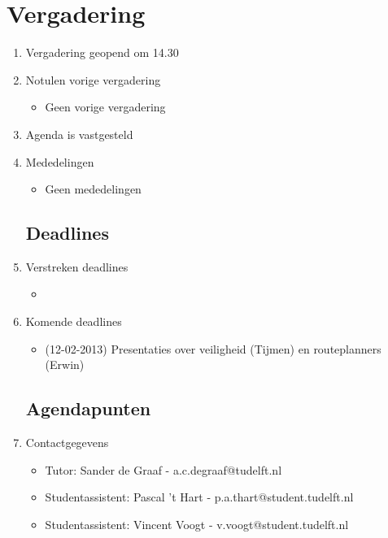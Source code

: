 \documentclass{article}
\begin{document}
\section*{Vergadering}
\begin{enumerate}
	
	\subsection*{Vooraf}
	\item Vergadering geopend om 14.30%
	\item Notulen vorige vergadering
	\begin{itemize}
		\item Geen vorige vergadering
	\end{itemize}
	\item Agenda is vastgesteld
	\item Mededelingen
	\begin{itemize}
		\item Geen mededelingen
	\end{itemize}

	\subsection*{Deadlines}
	\item Verstreken deadlines
	\begin{itemize}
		\item
	\end{itemize}
	\item Komende deadlines
	\begin{itemize}
		\item (12-02-2013) Presentaties over veiligheid (Tijmen) en routeplanners (Erwin)
	\end{itemize}

	\subsection*{Agendapunten}

	\item Contactgegevens
	\begin{itemize}
		\item Tutor: Sander de Graaf - a.c.degraaf@tudelft.nl
		\item Studentassistent: Pascal 't Hart - p.a.thart@student.tudelft.nl
		\item Studentassistent: Vincent Voogt - v.voogt@student.tudelft.nl
	\end{itemize}


\end{enumerate}
\end{document}
